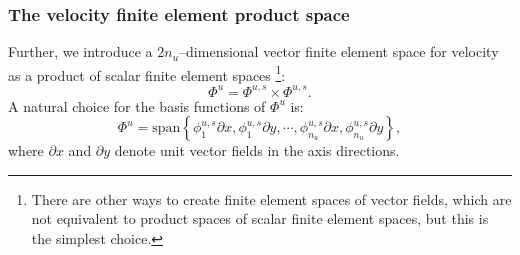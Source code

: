 \subsubsection{The velocity finite element product space }
Further, we introduce a $2n_u$--dimensional vector finite element space for velocity as a product of scalar finite element spaces
\footnote{
There are other ways to create finite element spaces of vector fields, which are not equivalent to product spaces of scalar finite element spaces,
but this is the simplest choice.}:
$$
    \Phi^u = \Phi^{u,s} \times \Phi^{u,s}.
$$
A natural choice for the basis functions of $\Phi^u$ is:
\begin{equation}\label{velocity_product_basis}
\Phi^u = \text{span}\left\{\phi_1^{u,s}\partial x, \phi_1^{u,s}\partial y,
    \cdots,
    \phi_{n_u}^{u,s}\partial x, \phi_{n_u}^{u,s}\partial y
\right\},
\end{equation}
where $\partial x$ and $\partial y$ denote unit vector fields in the axis directions.

